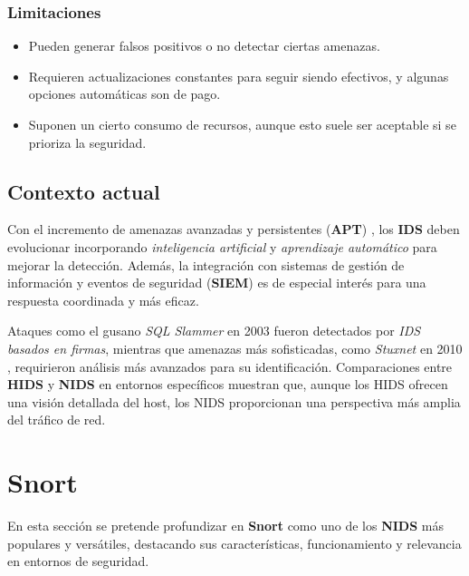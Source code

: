 \documentclass[11pt,a4paper,twoside]{report}
\begin{document}
\subsubsection{Limitaciones}

\begin{itemize}
	\item Pueden generar falsos positivos o no detectar ciertas amenazas.
	\item Requieren actualizaciones constantes para seguir siendo efectivos, y algunas opciones automáticas son de pago.
	\item Suponen un cierto consumo de recursos, aunque esto suele ser aceptable si se prioriza la seguridad.
\end{itemize}



\subsection{Contexto actual}

Con el incremento de amenazas avanzadas y persistentes (\textbf{APT}) \cite{cortes2017amenazas}, los \textbf{IDS} deben evolucionar incorporando \textit{inteligencia artificial} y \textit{aprendizaje automático} para mejorar la detección. Además, la integración con sistemas de gestión de información y eventos de seguridad (\textbf{SIEM}) es de especial interés para una respuesta coordinada y más eficaz.\newline

Ataques como el gusano \textit{SQL Slammer} en 2003 \cite{travis2004analysis} fueron detectados por \textit{IDS basados en firmas}, mientras que amenazas más sofisticadas, como \textit{Stuxnet} en 2010 \cite{kerr2010stuxnet} \cite{al2018stuxnet}, requirieron análisis más avanzados para su identificación. Comparaciones entre \textbf{HIDS} y \textbf{NIDS} en entornos específicos muestran que, aunque los HIDS ofrecen una visión detallada del host, los NIDS proporcionan una perspectiva más amplia del tráfico de red.

\section{Snort}

En esta sección se pretende profundizar en \textbf{Snort}\cite{snortweb} como uno de los \textbf{NIDS} más populares y versátiles, destacando sus características, funcionamiento y relevancia en entornos de seguridad.\newline
\end{document}

